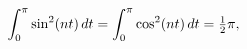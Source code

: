 \[\int_{0}^{\pi}{\mathop{\sin\/}\nolimits^{2}}\!\left(nt\right)dt=\int_{0}^{\pi}%
{\mathop{\cos\/}\nolimits^{2}}\!\left(nt\right)dt=\tfrac{1}{2}\pi,\]